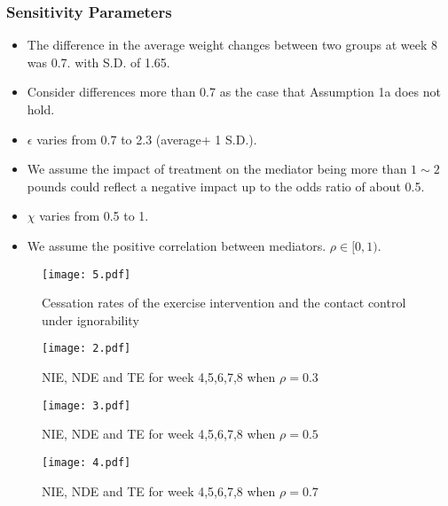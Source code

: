 \documentclass{beamer}
\begin{document}
\begin{frame}
\frametitle{Sensitivity Parameters}
\begin{itemize}
\item The difference in the average weight changes between two groups at week 8 was 0.7. with S.D. of 1.65.
\item Consider differences more than 0.7 as the case that Assumption
  1a does not hold. 
\item $\epsilon$ varies from 0.7 to 2.3 (average+ 1 S.D.).
\item We assume the impact of treatment on the mediator being more than $1\sim 2$ pounds could reflect a negative impact up to the odds ratio of about 0.5.
\item $\chi$ varies from 0.5 to 1.
\item We assume the positive correlation between mediators. $\rho\in [0,1)$.
\end{itemize}
\end{frame}

\begin{frame}
\begin{figure}[h]
\centering
\scalebox{0.44}
{\texttt{[image: 5.pdf]}}
\caption{Cessation rates of the exercise intervention and the contact
  control under ignorability}
\end{figure}
\end{frame}

\begin{frame}
\begin{figure}[h]
\centering
\scalebox{0.22}
{\texttt{[image: 2.pdf]}}
\caption{NIE, NDE and TE for week 4,5,6,7,8 when $\rho=0.3$}
\end{figure}
\end{frame}


\begin{frame}
\begin{figure}[h]
\centering
\scalebox{0.22}
{\texttt{[image: 3.pdf]}}
\caption{NIE, NDE and TE for week 4,5,6,7,8 when $\rho=0.5$}
\end{figure}
\end{frame}


\begin{frame}
\begin{figure}[h]
\centering
\scalebox{0.22}
{\texttt{[image: 4.pdf]}}
\caption{NIE, NDE and TE for week 4,5,6,7,8 when $\rho=0.7$}
\end{figure}
\end{frame}
\end{document}
